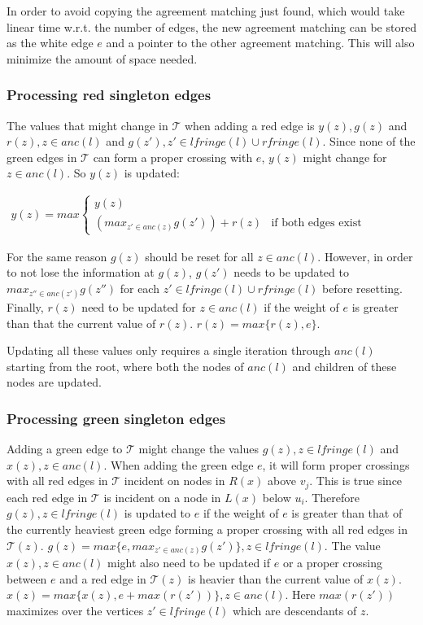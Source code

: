 In order to avoid copying the agreement matching just found, which would take linear time w.r.t. the number of edges, the new agreement matching can be stored as the white edge $e$ and a pointer to the other agreement matching. This will also minimize the amount of space needed.

\subsubsection{Processing red singleton edges}
The values that might change in $\mathcal{T}$ when adding a red edge is $y(z), g(z)$ and $r(z), z \in anc(l)$ and $g(z'), z' \in lfringe(l) \cup rfringe(l)$. Since none of the green edges in $\mathcal{T}$ can form a proper crossing with $e$, $y(z)$ might change for $z \in anc(l)$. So $y(z)$ is updated:

\begin{equation*}
\begin{aligned}
y(z)=max
\begin{cases}
y(z)
\\
(max_{z' \in anc(z)} g(z')) + r(z) & \text{if both edges exist}             
\end{cases}
\end{aligned}
\phantom{\hspace{6cm}}
\end{equation*}

For the same reason $g(z)$ should be reset for all $z \in anc(l)$. However, in order to not lose the information at $g(z)$, $g(z')$ needs to be updated to $max_{z'' \in anc(z')} g(z'')$ for each $z' \in lfringe(l) \cup rfringe(l)$ before resetting. Finally, $r(z)$ need to be updated for $z \in anc(l)$ if the weight of $e$ is greater than that the current value of $r(z)$. $r(z)=max\{r(z), e\}$.

Updating all these values only requires a single iteration through $anc(l)$ starting from the root, where both the nodes of $anc(l)$ and children of these nodes are updated.

\subsubsection{Processing green singleton edges}
Adding a green edge to $\mathcal{T}$ might change the values $g(z), z \in lfringe(l)$ and $x(z), z \in anc(l)$. When adding the green edge $e$, it will form proper crossings with all red edges in $\mathcal{T}$ incident on nodes in $R(x)$ above $v_j$. This is true since each red edge in $\mathcal{T}$ is incident on a node in $L(x)$ below $u_i$. Therefore $g(z), z \in lfringe(l)$ is updated to $e$ if the weight of $e$ is greater than that of the currently heaviest green edge forming a proper crossing with all red edges in $\mathcal{T}(z)$. $g(z)=max\{e, max_{z' \in anc(z)} g(z')\}, z \in lfringe(l)$. The value $x(z), z \in anc(l)$ might also need to be updated if $e$ or a proper crossing between $e$ and a red edge in $\mathcal{T}(z)$ is heavier than the current value of $x(z)$. $x(z)=max\{x(z), e + max(r(z'))\}, z \in anc(l)$. Here $max(r(z'))$ maximizes over the vertices $z' \in lfringe(l)$ which are descendants of $z$.

